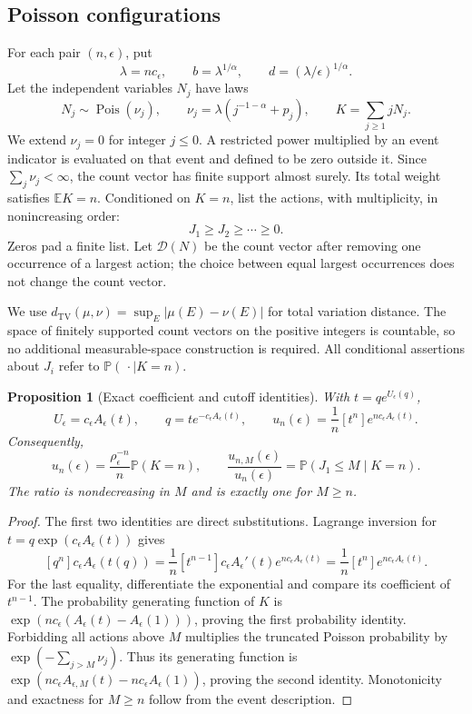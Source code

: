 \documentclass[11pt,a4paper]{article}
\numberwithin{equation}{section}
\newtheorem{proposition}[theorem]{Proposition}
\theoremstyle{definition}
\theoremstyle{remark}
\newcommand{\E}{\mathbb E}
\newcommand{\Prob}{\mathbb P}
\newcommand{\ee}{\epsilon}
\newcommand{\tv}{d_{\mathrm{TV}}}
\DeclareMathOperator{\Pois}{Pois}
\begin{document}
\subsection{Poisson configurations}
For each pair $(n,\ee)$, put
\begin{equation}\label{eq:scales}
 \lambda=nc_\ee,\qquad b=\lambda^{1/\alpha},\qquad
 d=(\lambda/\ee)^{1/\alpha}.
\end{equation}
Let the independent variables $N_j$ have laws
\begin{equation}\label{eq:poisson}
 N_j\sim\Pois(\nu_j),\qquad
 \nu_j=\lambda(j^{-1-\alpha}+p_j),\qquad
 K=\sum_{j\ge1}jN_j.
\end{equation}
We extend $\nu_j=0$ for integer $j\le0$. A restricted power multiplied
by an event indicator is evaluated on that event and defined to be zero
outside it. Since $\sum_j\nu_j<\infty$, the count vector has finite support
almost surely. Its total weight satisfies $\E K=n$. Conditioned on $K=n$, list the
actions, with multiplicity, in nonincreasing order:
\[
 J_1\ge J_2\ge\cdots\ge0.
\]
Zeros pad a finite list. Let $\mathcal D(N)$ be the count vector after
removing one occurrence of a largest action; the choice between equal
largest occurrences does not change the count vector.

We use $\tv(\mu,\nu)=\sup_E|\mu(E)-\nu(E)|$ for total variation distance.
The space of finitely supported count vectors on the positive integers is
countable, so no additional measurable-space construction is required.
All conditional assertions about $J_i$ refer to $\Prob(\,\cdot\mid K=n)$.

\begin{proposition}[Exact coefficient and cutoff identities]\label{prop:exact}
With $t=qe^{U_\ee(q)}$,
\begin{equation}\label{eq:parametric}
 U_\ee=c_\ee A_\ee(t),\qquad q=t e^{-c_\ee A_\ee(t)},
 \qquad
 u_n(\ee)=\frac1n[t^n]e^{nc_\ee A_\ee(t)}.
\end{equation}
Consequently,
\begin{equation}\label{eq:coefficientprob}
 u_n(\ee)=\frac{\rho_\ee^{-n}}n\Prob(K=n),\qquad
 \frac{u_{n,M}(\ee)}{u_n(\ee)}
 =\Prob(J_1\le M\mid K=n).
\end{equation}
The ratio is nondecreasing in $M$ and is exactly one for $M\ge n$.
\end{proposition}
\begin{proof}
The first two identities are direct substitutions. Lagrange inversion for
$t=q\exp(c_\ee A_\ee(t))$ gives
\[
 [q^n]c_\ee A_\ee(t(q))
 =\frac1n[t^{n-1}]c_\ee A_\ee'(t)e^{nc_\ee A_\ee(t)}
 =\frac1n[t^n]e^{nc_\ee A_\ee(t)}.
\]
For the last equality, differentiate the exponential and compare its
coefficient of $t^{n-1}$. The probability generating function of $K$ is
$\exp(nc_\ee(A_\ee(t)-A_\ee(1)))$, proving the first probability identity.
Forbidding all actions above $M$ multiplies the truncated Poisson
probability by $\exp(-\sum_{j>M}\nu_j)$. Thus its generating function is
$\exp(nc_\ee A_{\ee,M}(t)-nc_\ee A_\ee(1))$, proving the second identity.
Monotonicity and exactness for $M\ge n$ follow from the event description.
\end{proof}
\end{document}
